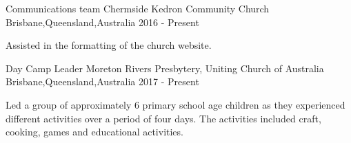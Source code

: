 \begin{cventries}

\cventry
{Communications team} %
{Chermside Kedron Community Church} %
{Brisbane,Queensland,Australia} %
{2016 - Present} %
{ %
	\begin{cvitems}
		\item {Assisted in the formatting of the church website.}
	\end{cvitems}
}


\cventry
{Day Camp Leader} %
{Moreton Rivers Presbytery, Uniting Church of Australia} %
{Brisbane,Queensland,Australia} %
{2017 - Present} %
{ %
	\begin{cvitems}
		\item {Led a group of approximately 6 primary school age children as they experienced different activities over a period of four days. The activities included craft, cooking, games and educational activities.}
	\end{cvitems}
}

\end{cventries}